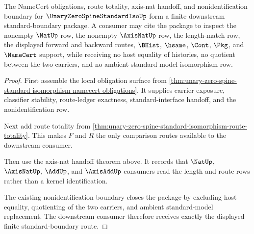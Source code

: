 \begin{theorem}
\label{thm:unary-zero-spine-standard-isomorphism-downstream-unblock}
The NameCert obligations, route totality, axis-nat handoff, and nonidentification boundary for $\UnaryZeroSpineStandardIsoUp$ form a finite downstream standard-boundary package. A consumer may cite the package to inspect the nonempty $\NatUp$ row, the nonempty $\AxisNatUp$ row, the length-match row, the displayed forward and backward routes, $\BHist$, $\hsame$, $\Cont$, $\Pkg$, and $\NameCert$ support, while receiving no host equality of histories, no quotient between the two carriers, and no ambient standard-model isomorphism row.
\end{theorem}
\begin{proof}
First assemble the local obligation surface from \autoref{thm:unary-zero-spine-standard-isomorphism-namecert-obligations}. It supplies carrier exposure, classifier stability, route-ledger exactness, standard-interface handoff, and the nonidentification row.

Next add route totality from \autoref{thm:unary-zero-spine-standard-isomorphism-route-totality}. This makes $F$ and $R$ the only comparison routes available to the downstream consumer.

Then use the axis-nat handoff theorem above. It records that $\NatUp$, $\AxisNatUp$, $\AddUp$, and $\AxisAddUp$ consumers read the length and route rows rather than a kernel identification.

The existing nonidentification boundary closes the package by excluding host equality, quotienting of the two carriers, and ambient standard-model replacement. The downstream consumer therefore receives exactly the displayed finite standard-boundary route.
\end{proof}


